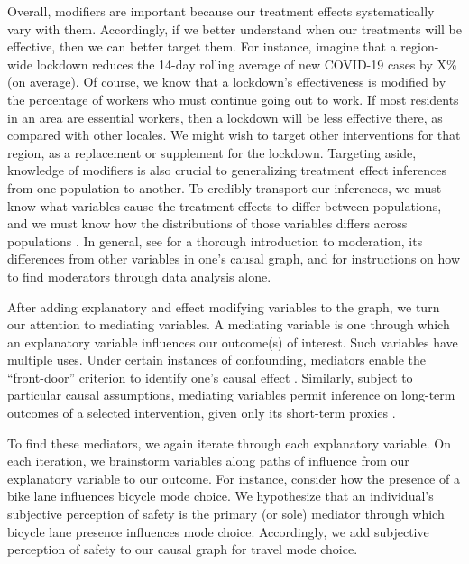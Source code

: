 Overall, modifiers are important because our treatment effects systematically vary with them.
Accordingly, if we better understand when our treatments will be effective, then we can better target them.
For instance, imagine that a region-wide lockdown reduces the 14-day rolling average of new COVID-19 cases by X\% (on average).
Of course, we know that a lockdown's effectiveness is modified by the percentage of workers who must continue going out to work.
If most residents in an area are essential workers, then a lockdown will be less effective there, as compared with other locales.
We might wish to target other interventions for that region, as a replacement or supplement for the lockdown.
Targeting aside, knowledge of modifiers is also crucial to generalizing treatment effect inferences from one population to another.
To credibly transport our inferences, we must know what variables cause the treatment effects to differ between populations, and we must know how the distributions of those variables differs across populations \citep{pearl_2014_external}.
In general, see \citet{zheng_2018_automated} for a thorough introduction to moderation, its differences from other variables in one's causal graph, and for instructions on how to find moderators through data analysis alone.

After adding explanatory and effect modifying variables to the graph, we turn our attention to mediating variables.
A mediating variable is one through which an explanatory variable influences our outcome(s) of interest.
Such variables have multiple uses.
Under certain instances of confounding, mediators enable the ``front-door'' criterion to identify one's causal effect \citep{glynn_2018_front, bellemare_2019_paper, gupta_2020_estimating}.
Similarly, subject to particular causal assumptions, mediating variables permit inference on long-term outcomes of a selected intervention, given only its short-term proxies \citep{athey_2019_estimating, yang_2020_targeting}.

To find these mediators, we again iterate through each explanatory variable.
On each iteration, we brainstorm variables along paths of influence from our explanatory variable to our outcome.
For instance, consider how the presence of a bike lane influences bicycle mode choice.
We hypothesize that an individual's subjective perception of safety is the primary (or sole) mediator through which bicycle lane presence influences mode choice.
Accordingly, we add subjective perception of safety to our causal graph for travel mode choice.

